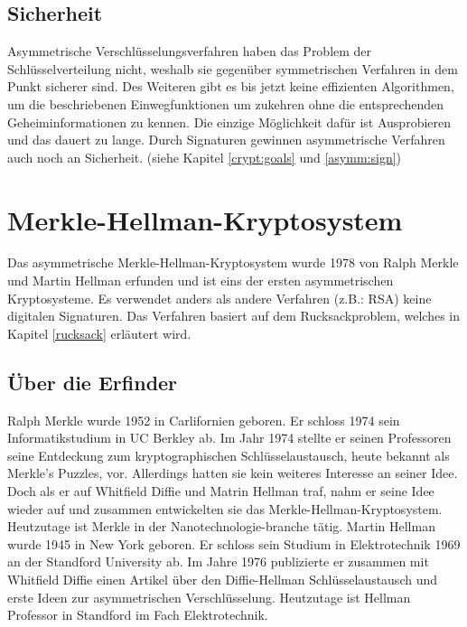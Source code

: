 \documentclass[a4paper,12pt,titlepage]{article}
\begin{document}
\subsection{Sicherheit} %
Asymmetrische Verschlüsselungsverfahren haben das Problem der Schlüsselverteilung nicht, weshalb sie gegenüber symmetrischen Verfahren in dem Punkt sicherer sind. Des Weiteren gibt es bis jetzt keine effizienten Algorithmen, um die beschriebenen Einwegfunktionen um zukehren ohne die entsprechenden Geheiminformationen zu kennen. Die einzige Möglichkeit dafür ist Ausprobieren und das dauert zu lange. Durch Signaturen gewinnen asymmetrische Verfahren auch noch an Sicherheit. (siehe Kapitel \ref{crypt:goals} und \ref{asymm:sign})



\section{Merkle-Hellman-Kryptosystem}\label{mhk}
Das asymmetrische Merkle-Hellman-Kryptosystem wurde 1978 von Ralph Merkle und Martin Hellman erfunden und ist eins der ersten asymmetrischen Kryptosysteme. Es verwendet anders als andere Verfahren (z.B.: RSA) keine digitalen Signaturen. Das Verfahren basiert auf dem Rucksackproblem, welches in Kapitel \ref{rucksack} erläutert wird.

\subsection{Über die Erfinder}
Ralph Merkle wurde 1952 in Carlifornien geboren. Er schloss 1974 sein Informatikstudium in UC Berkley ab. Im Jahr 1974 stellte er seinen Professoren seine Entdeckung zum kryptographischen Schlüsselaustausch, heute bekannt als Merkle's Puzzles, vor. Allerdings hatten sie kein weiteres Interesse an seiner Idee. Doch als er auf Whitfield Diffie und Matrin Hellman traf, nahm er seine Idee wieder auf und zusammen entwickelten sie das Merkle-Hellman-Kryptosystem. Heutzutage ist Merkle in der Nanotechnologie-branche tätig.  \newline Martin Hellman wurde 1945 in New York geboren. Er schloss sein Studium in Elektrotechnik 1969 an der Standford University ab. Im Jahre 1976 publizierte er zusammen mit Whitfield Diffie einen Artikel über den Diffie-Hellman Schlüsselaustausch und erste Ideen zur asymmetrischen Verschlüsselung. Heutzutage ist Hellman Professor in Standford im Fach Elektrotechnik.
\end{document}
